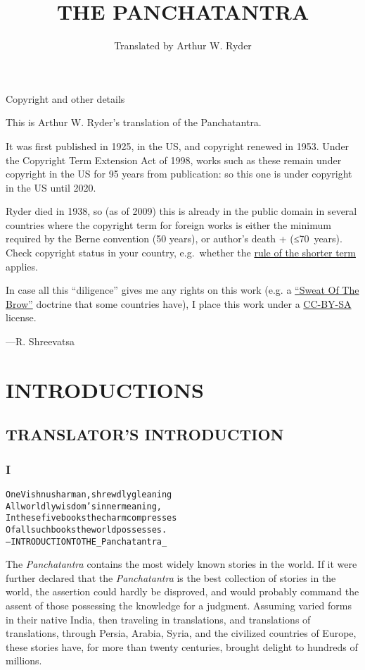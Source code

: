 \documentclass{article}
\title{THE PANCHATANTRA}
\author{Translated by Arthur W. Ryder}
\renewenvironment{verbatim}{\begin{alltt}\normalfont\begin{centering}}{\end{centering}\end{alltt}}
\begin{document}
\maketitle

\tableofcontents

Copyright and other details

This is Arthur W. Ryder's translation of the Panchatantra.

It was first published in 1925, in the US, and copyright renewed in
1953. Under the Copyright Term Extension Act of 1998, works such as
these remain under copyright in the US for 95 years from
publication: so this one is under copyright in the US until 2020.

Ryder died in 1938, so (as of 2009) this is already in the public
domain in several countries where the copyright term for foreign
works is either the minimum required by the Berne convention (50
years), or author's death + (≤70~years). Check copyright status in
your country, e.g.~whether the
\href{http://en.wikipedia.org/wiki/Rule_of_the_shorter_term}{rule of the shorter term}
applies.

In case all this ``diligence'' gives me any rights on this work
(e.g. a
\href{http://www.gutenberg.org/wiki/Gutenberg:No_Sweat_of_the_Brow_Copyright}{``Sweat Of The Brow''}
doctrine that some countries have), I place this work under a
\href{http://creativecommons.org/licenses/by-sa/3.0/}{CC-BY-SA}
license.

---R. Shreevatsa

\section{INTRODUCTIONS}

\subsection{TRANSLATOR'S INTRODUCTION}

\subsubsection{I}

\begin{verbatim}
One Vishnusharman, shrewdly gleaning
All worldly wisdom's inner meaning,
In these five books the charm compresses
Of all such books the world possesses.
        --INTRODUCTION TO THE _Panchatantra_
\end{verbatim}
The \emph{Panchatantra} contains the most widely known stories in
the world. If it were further declared that the \emph{Panchatantra}
is the best collection of stories in the world, the assertion could
hardly be disproved, and would probably command the assent of those
possessing the knowledge for a judgment. Assuming varied forms in
their native India, then traveling in translations, and
translations of translations, through Persia, Arabia, Syria, and
the civilized countries of Europe, these stories have, for more
than twenty centuries, brought delight to hundreds of millions.
\end{document}
